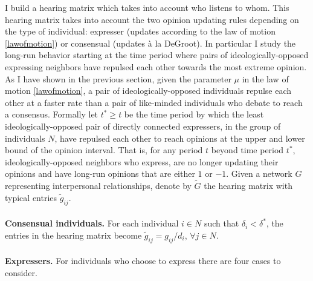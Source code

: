 \documentclass{article}
\begin{document}
I build a hearing matrix which takes into account who listens to whom. This hearing matrix takes into account the two opinion updating rules depending on the type of individual: expresser (updates according to the law of motion \eqref{lawofmotion}) or consensual (updates \`{a} la DeGroot). In particular I study the long-run behavior starting at the time period where pairs of ideologically-opposed expressing neighbors have repulsed each other towards the most extreme opinion. As I have shown in the previous section, given the parameter $\mu$ in the law of motion \eqref{lawofmotion}, a pair of ideologically-opposed individuals repulse each other at a faster rate than a pair of like-minded individuals who debate to reach a consensus. Formally let  $t^{*} \geq t$ be the time period by which the least ideologically-opposed pair of directly connected expressers, in the group of individuals $N$, have repulsed each other to reach opinions at the upper and lower bound of the opinion interval.  That is, for any period $t$ beyond time period $t^{*}$, ideologically-opposed neighbors who express, are no longer updating their opinions and have long-run opinions that are either $1$ or $-1$. Given a network $G$ representing interpersonal relationships, denote by $\tilde{G}$ the hearing matrix with typical entries $\tilde{g}_{ij}$. \\
\\ \textbf{Consensual individuals.} For each individual $i \in N$ such that $\delta_i < \delta^{*}$, the entries in the hearing matrix become $\tilde{g}_{ij} = g_{ij}/d_i$, $\forall j \in N$. \\
\\ \textbf{Expressers.} For individuals who choose to express there are four cases to consider. 
\end{document}

